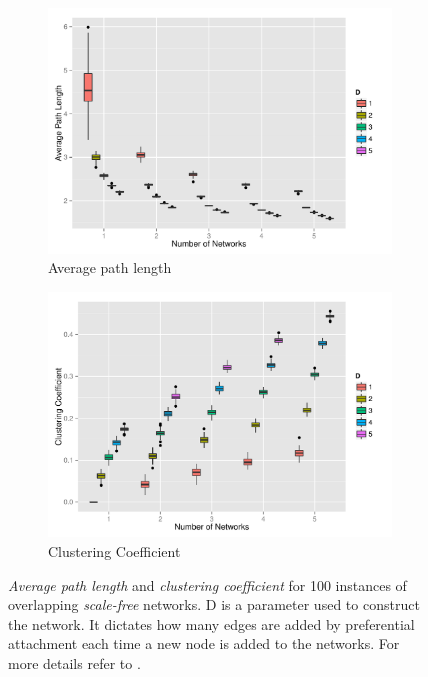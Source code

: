 \begin{figure}[H]
\centering
\begin{subfigure}{.5\linewidth}
  \centering
 \includegraphics[width=1\linewidth]{"../analysis/pdf/network_properties_apl_sf_12345"}
 \caption{Average path length}
 \label{append_fig:network_properties_apl_sf_12345}
\end{subfigure}%
\begin{subfigure}{.5\linewidth}
  \centering
 \includegraphics[width=1\linewidth]{"../analysis/pdf/network_properties_cc_sf_12345"}
 \caption{Clustering Coefficient}
 \label{append_fig:network_properties_cc_sf_12345}
\end{subfigure}
\begin{minipage}{0.9\linewidth}
	\vspace{0.2cm}
	\caption{\textit{Average path length} and \textit{clustering coefficient} for 100 instances of overlapping \textit{scale-free} networks. D is a parameter used to construct the network. It dictates how many edges are added by preferential attachment each time a new node is added to the networks. For more details refer to \cite{Barabasi1999}.}
	\label{append_fig:network_properties_sf}
\end{minipage}
\end{figure}


